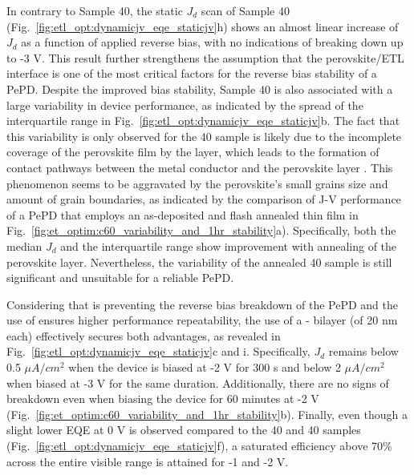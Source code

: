In contrary to Sample 40, the static $J_d$ scan of Sample 40 (Fig.~\ref{fig:etl_opt:dynamicjv_eqe_staticjv}h) shows an almost linear increase of $J_d$ as a function of applied reverse bias, with no indications of breaking down up to -3 V. This result further strengthens the assumption that the perovskite/ETL interface is one of the most critical factors for the reverse bias stability of a PePD. Despite the improved bias stability, Sample 40 is also associated with a large variability in device performance, as indicated by the spread of the interquartile range in Fig.~\ref{fig:etl_opt:dynamicjv_eqe_staticjv}b. The fact that this variability is only observed for the 40 sample is likely due to the incomplete coverage of the perovskite film by the  layer, which leads to the formation of contact pathways between the metal conductor and the perovskite layer \cite{Lin2015LowImaging, Younes2021EnhancingLayer}. This phenomenon seems to be aggravated by the perovskite's small grains size and amount of grain boundaries, as indicated by the comparison of J-V performance of a PePD that employs an as-deposited and flash annealed  thin film in Fig.~\ref{fig:et_optim:c60_variability_and_1hr_stability}a). Specifically, both the median $J_d$ and the interquartile range show improvement with annealing of the perovskite layer. Nevertheless, the variability of the annealed 40 sample is still significant and unsuitable for a reliable PePD. 


Considering that  is preventing the reverse bias breakdown of the PePD and the use of  ensures higher performance repeatability, the use of a - bilayer (of 20 nm each) effectively secures both advantages, as revealed in Fig.~\ref{fig:etl_opt:dynamicjv_eqe_staticjv}c and i. Specifically, $J_d$ remains below 0.5 $\mu A/cm^2$ when the device is biased at -2 V for 300 s and below 2 $\mu A/cm^2$ when biased at -3 V for the same duration. Additionally, there are no signs of breakdown even when biasing the device for 60 minutes at -2 V (Fig.~\ref{fig:et_optim:c60_variability_and_1hr_stability}b). Finally, even though a slight lower EQE at 0 V is observed compared to the 40 and 40 samples (Fig.~\ref{fig:etl_opt:dynamicjv_eqe_staticjv}f), a saturated efficiency above 70\% across the entire visible range is attained for -1 and -2 V. 


